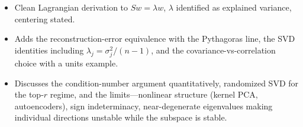 \begin{interviewq}

\goodgreat
\begin{itemize}
    \item {} Clean Lagrangian derivation to $Sw = \lambda w$, $\lambda$ identified as explained variance, centering stated.
    \item {} Adds the reconstruction-error equivalence with the Pythagoras line, the SVD identities including $\lambda_j = \sigma_j^2/(n-1)$, and the covariance-vs-correlation choice with a units example.
    \item {} Discusses the condition-number argument quantitatively, randomized SVD for the top-$r$ regime, and the limits---nonlinear structure (kernel PCA, autoencoders), sign indeterminacy, near-degenerate eigenvalues making individual directions unstable while the subspace is stable.
\end{itemize}

\end{interviewq}

